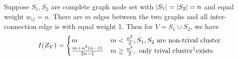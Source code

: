\begin{proposition}\label{prop:reweight}
Suppose $S_1, S_2 $ are complete graph node set with $\lvert S_1\rvert=\lvert S_2\rvert=n$ and equal weight $w_{ij}=n$. There are $m$ edges between the two graphs and all inter-connection edge is with equal weight 1. Then for $V=S_1\cup S_2$, we have
\begin{equation}
I(Z_V) = \begin{cases}
m & m <\frac{n^2}{2}, S_1,S_2 \textrm{ are non-trival cluster} \\
\frac{m+n^2(n-1)}{2n-1} & m\geq \frac{n^2}{2}, \textrm{ only trival cluster\footnotemark exists} 
\end{cases}
\end{equation}
\end{proposition}
